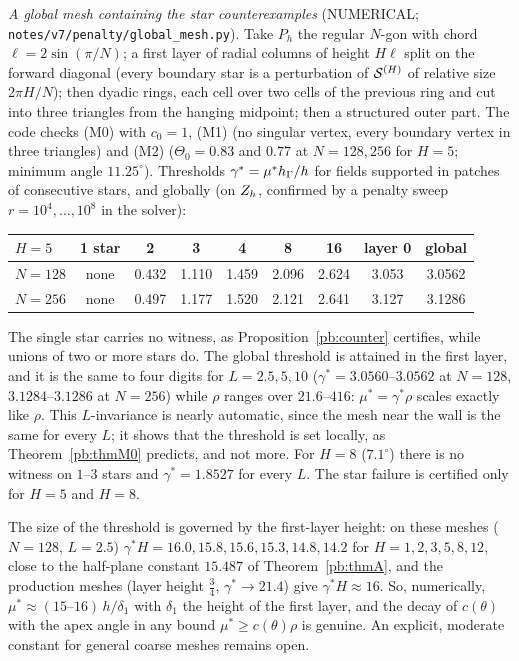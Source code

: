 \emph{A global mesh containing the star counterexamples} (NUMERICAL; \texttt{notes/v7/penalty/}\allowbreak\texttt{global\_mesh.py}). Take $P_h$ the regular $N$-gon with chord $\ell=2\sin(\pi/N)$; a first layer of radial columns of height $H\ell$ split on the forward diagonal (every boundary star is a perturbation of $\mathcal S^{(H)}$ of relative size $2\pi H/N$); then dyadic rings, each cell over two cells of the previous ring and cut into three triangles from the hanging midpoint; then a structured outer part. The code checks (M0) with $c_0=1$, (M1) (no singular vertex, every boundary vertex in three triangles) and (M2) ($\Theta_0=0.83$ and $0.77$ at $N=128,256$ for $H=5$; minimum angle $11.25^\circ$). Thresholds $\gamma^\ast=\mu^\ast h_\Gamma/h$ for fields supported in patches of consecutive stars, and globally (on $Z_h$, confirmed by a penalty sweep $r=10^4,\dots,10^8$ in the solver):
\begin{center}\small\begin{tabular}{lcccccccc}
\toprule
$H=5$ & 1 star & 2 & 3 & 4 & 8 & 16 & layer 0 & global\\
\midrule
$N=128$ & none & 0.432 & 1.110 & 1.459 & 2.096 & 2.624 & 3.053 & 3.0562\\
$N=256$ & none & 0.497 & 1.177 & 1.520 & 2.121 & 2.641 & 3.127 & 3.1286\\
\bottomrule
\end{tabular}\end{center}
The single star carries no witness, as Proposition~\ref{pb:counter} certifies, while unions of two or more stars do. The global threshold is attained in the first layer, and it is the same to four digits for $L=2.5,5,10$ ($\gamma^\ast=3.0560$--$3.0562$ at $N=128$, $3.1284$--$3.1286$ at $N=256$) while $\rho$ ranges over $21.6$--$416$: $\mu^\ast=\gamma^\ast\rho$ scales exactly like $\rho$. This $L$-invariance is nearly automatic, since the mesh near the wall is the same for every $L$; it shows that the threshold is set locally, as Theorem~\ref{pb:thmM0} predicts, and not more. For $H=8$ ($7.1^\circ$) there is no witness on $1$--$3$ stars and $\gamma^\ast=1.8527$ for every $L$. The star failure is certified only for $H=5$ and $H=8$.

The size of the threshold is governed by the first-layer height: on these meshes ($N=128$, $L=2.5$) $\gamma^\ast H=16.0,15.8,15.6,15.3,14.8,14.2$ for $H=1,2,3,5,8,12$, close to the half-plane constant $15.487$ of Theorem~\ref{pb:thmA}, and the production meshes (layer height $\frac34$, $\gamma^\ast\to21.4$) give $\gamma^\ast H\approx16$. So, numerically, $\mu^\ast\approx(15\text{--}16)\,h/\delta_1$ with $\delta_1$ the height of the first layer, and the decay of $c(\theta)$ with the apex angle in any bound $\mu^\ast\ge c(\theta)\rho$ is genuine. An explicit, moderate constant for general coarse meshes remains open.

